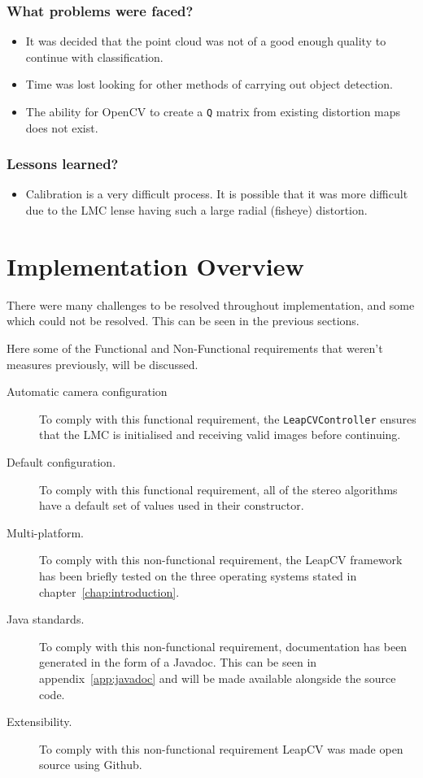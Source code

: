 \documentclass[11pt,oneside]{report}
\newcommand\code[1]{\texttt{#1}}
\begin{document}
			\subsubsection{What problems were faced?}
			\begin{itemize}
				\item It was decided that the point cloud was not of a good enough quality to continue with classification.
				\item Time was lost looking for other methods of carrying out object detection.
				\item The ability for OpenCV to create a \code{Q} matrix from existing distortion maps does not exist.
			\end{itemize}
			\subsubsection{Lessons learned?}
			\begin{itemize}
				\item Calibration is a very difficult process. It is possible that it was more difficult due to the LMC lense having such a large radial (fisheye) distortion.
			\end{itemize}
			
	\section{Implementation Overview}
		There were many challenges to be resolved throughout implementation, and some which could not be resolved. 
		This can be seen in the previous sections.

		Here some of the Functional and Non-Functional requirements that weren't measures previously, will be discussed.
		
		\begin{description}
			\item[Automatic camera configuration] To comply with this functional requirement, the \code{LeapCVController} ensures that the LMC is initialised and receiving valid images before continuing.
			\item[Default configuration.] To comply with this functional requirement, all of the stereo algorithms have a default set of values used in their constructor.
			\item[Multi-platform.] To comply with this non-functional requirement, the LeapCV framework has been briefly tested on the three operating systems stated in chapter~\ref{chap:introduction}.
			\item[Java standards.] To comply with this non-functional requirement, documentation has been generated in the form of a Javadoc. This can be seen in appendix~\ref{app:javadoc} and will be made available alongside the source code.
			\item[Extensibility.] To comply with this non-functional requirement LeapCV was made open source using Github.
		\end{description}
		
\end{document}

